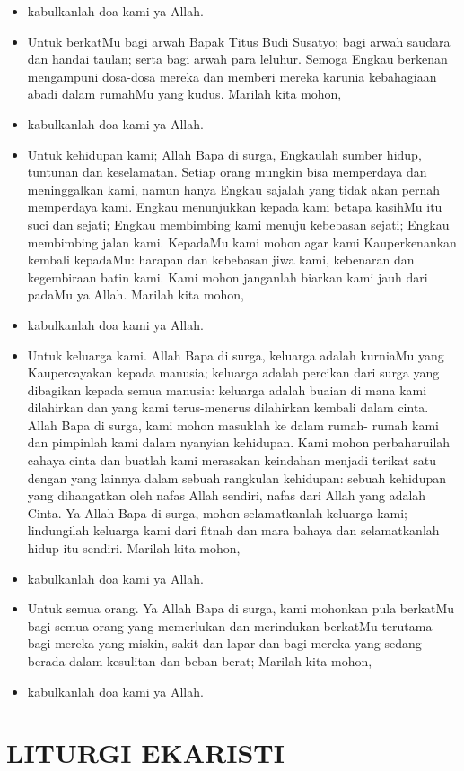 \documentclass[a5paper,headsepline,titlepage,12pt,nnormalheadings,DIVcalc,twoside]{scrbook}
\newcommand{\BU}[1]{\begin{itemize} \item[U:] #1 \end{itemize}}
\newcommand{\BP}[1]{\begin{itemize} \item[P:] #1 \end{itemize}}
\newcommand{\namaalm}{Bapak Titus Budi Susatyo}
\begin{document}
\BU{kabulkanlah doa kami ya Allah.} 

\BP{Untuk berkatMu bagi arwah \namaalm; bagi arwah saudara 
dan handai taulan; serta bagi arwah para leluhur. Semoga 
Engkau berkenan mengampuni dosa-dosa mereka dan 
memberi mereka karunia kebahagiaan abadi dalam rumahMu 
yang kudus. Marilah kita mohon,}

\BU{kabulkanlah doa kami ya Allah.} 

\BP{Untuk kehidupan kami; Allah Bapa di surga, Engkaulah 
sumber hidup, tuntunan dan keselamatan. Setiap orang 
mungkin bisa memperdaya dan meninggalkan kami, namun 
hanya Engkau sajalah yang tidak akan pernah memperdaya 
kami. Engkau menunjukkan kepada kami betapa kasihMu itu 
suci dan sejati; Engkau membimbing kami menuju kebebasan 
sejati; Engkau membimbing jalan kami. KepadaMu kami 
mohon agar kami Kauperkenankan kembali kepadaMu: 
harapan dan kebebasan jiwa kami, kebenaran dan 
kegembiraan batin kami. Kami mohon janganlah biarkan 
kami jauh dari padaMu ya Allah. Marilah kita mohon,}

\BU{kabulkanlah doa kami ya Allah.} 

\BP{Untuk keluarga kami. Allah Bapa di surga, keluarga adalah 
kurniaMu yang Kaupercayakan kepada manusia; keluarga 
adalah percikan dari surga yang dibagikan kepada semua 
manusia: keluarga adalah buaian di mana kami dilahirkan dan 
yang kami terus-menerus dilahirkan kembali dalam cinta. 
Allah Bapa di surga, kami mohon masuklah ke dalam rumah-
rumah kami dan pimpinlah kami dalam nyanyian kehidupan. 
Kami mohon perbaharuilah cahaya cinta dan buatlah kami 
merasakan keindahan menjadi terikat satu dengan yang 
lainnya dalam sebuah rangkulan kehidupan: sebuah 
kehidupan yang dihangatkan oleh nafas Allah sendiri, nafas 
dari Allah yang adalah Cinta. Ya Allah Bapa di surga, mohon 
selamatkanlah keluarga kami; lindungilah keluarga kami dari 
fitnah dan mara bahaya dan selamatkanlah hidup itu sendiri. 
Marilah kita mohon,}

\BU{kabulkanlah doa kami ya Allah.} 

\BP{Untuk semua orang. Ya Allah Bapa di surga, kami mohonkan 
pula berkatMu bagi semua orang yang memerlukan dan 
merindukan berkatMu terutama bagi mereka yang miskin, 
sakit dan lapar dan bagi mereka yang sedang berada dalam 
kesulitan dan beban berat; Marilah kita mohon,}

\BU{kabulkanlah doa kami ya Allah.} 

\section*{LITURGI EKARISTI}
\end{document}
